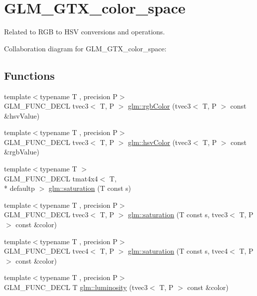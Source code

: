 \hypertarget{group__gtx__color__space}{\section{G\-L\-M\-\_\-\-G\-T\-X\-\_\-color\-\_\-space}
\label{group__gtx__color__space}
}


Related to R\-G\-B to H\-S\-V conversions and operations.  


Collaboration diagram for G\-L\-M\-\_\-\-G\-T\-X\-\_\-color\-\_\-space\-:
\subsection*{Functions}
\begin{DoxyCompactItemize}
\item 
{\footnotesize template$<$typename T , precision P$>$ }\\G\-L\-M\-\_\-\-F\-U\-N\-C\-\_\-\-D\-E\-C\-L tvec3$<$ T, P $>$ \hyperlink{group__gtx__color__space_ga36b0619e31daf57bc4a54dac2dcf34b7}{glm\-::rgb\-Color} (tvec3$<$ T, P $>$ const \&hsv\-Value)
\item 
{\footnotesize template$<$typename T , precision P$>$ }\\G\-L\-M\-\_\-\-F\-U\-N\-C\-\_\-\-D\-E\-C\-L tvec3$<$ T, P $>$ \hyperlink{group__gtx__color__space_gae72039c00a7be2f03a3b94b37a54349a}{glm\-::hsv\-Color} (tvec3$<$ T, P $>$ const \&rgb\-Value)
\item 
{\footnotesize template$<$typename T $>$ }\\G\-L\-M\-\_\-\-F\-U\-N\-C\-\_\-\-D\-E\-C\-L tmat4x4$<$ T, \\*
defaultp $>$ \hyperlink{group__gtx__color__space_gafecfb15d58da8445103745af3348e516}{glm\-::saturation} (T const s)
\item 
{\footnotesize template$<$typename T , precision P$>$ }\\G\-L\-M\-\_\-\-F\-U\-N\-C\-\_\-\-D\-E\-C\-L tvec3$<$ T, P $>$ \hyperlink{group__gtx__color__space_ga632ee8dadb44e90a05885f6f8c07d46c}{glm\-::saturation} (T const s, tvec3$<$ T, P $>$ const \&color)
\item 
{\footnotesize template$<$typename T , precision P$>$ }\\G\-L\-M\-\_\-\-F\-U\-N\-C\-\_\-\-D\-E\-C\-L tvec4$<$ T, P $>$ \hyperlink{group__gtx__color__space_ga2033e0566c595230714af396744e8a61}{glm\-::saturation} (T const s, tvec4$<$ T, P $>$ const \&color)
\item 
{\footnotesize template$<$typename T , precision P$>$ }\\G\-L\-M\-\_\-\-F\-U\-N\-C\-\_\-\-D\-E\-C\-L T \hyperlink{group__gtx__color__space_gaa2f38a5100c3e1c7d39920df43bd8cbe}{glm\-::luminosity} (tvec3$<$ T, P $>$ const \&color)
\end{DoxyCompactItemize}


